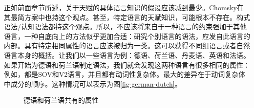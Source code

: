 正如前面章节所述，关于天赋的具体语言知识的假设应该减到最少。Chomsky在其最简方案中也持这个观点。甚至，特定语言的天赋知识，可能根本不存在。构式语法/认知语法都持这个观点。所以，不应该将来自于一种语言的约束强加于其他语言，一种自底向上的方法似乎更加合适：研究个别语言的语法，应发自此语言的内部。具有特定相同属性的语言应该被归为一类。这可以获得不同组语言或者自然语言本身的概括。让我们以一些语言为例：德语、荷兰语、丹麦语、英语和法语。如果开始为德语和荷兰语制定语法，我们就会发现这两种语言有很多相同的属性：例如，都是SOV和V2语言，并且都有动词性复杂体。最大的差异在于动词复杂体中成分的顺序。这种情况可以表示为图\vref{fig-german-dutch}。
\begin{figure}
\centering
{}
\caption{\label{fig-german-dutch}德语和荷兰语共有的属性}
\end{figure}%
